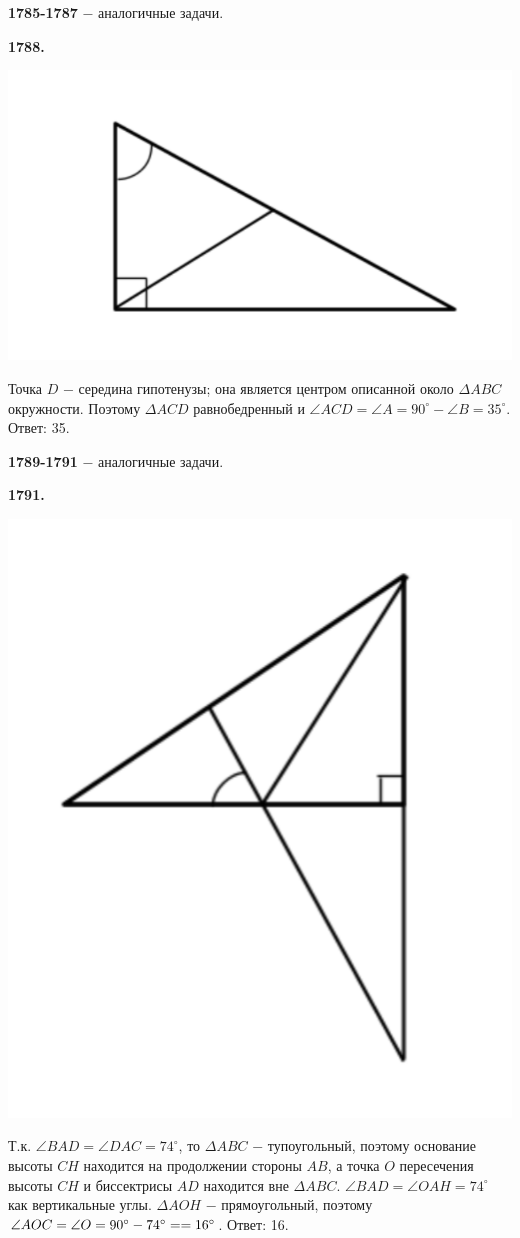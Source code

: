\textbf{1785-1787} $-$ аналогичные задачи.

\textbf{1788.}

{\centering \includegraphics[width=0.5\linewidth]{Geometry/Content/9.png}
	
}

Точка $D$ $-$ середина гипотенузы; она является центром описанной около $\Delta ABC$ окружности. Поэтому $\Delta ACD$ равнобедренный и $\angle ACD = \angle A = 90^\circ - \angle B = 35^\circ.$ 
\newline \null \hspace*{\fill} Ответ: 35.

\textbf{1789-1791} $-$ аналогичные задачи.

\clearpage 

\textbf{1791.}

{\centering \includegraphics[width=0.4\linewidth]{Geometry/Content/10.png}
	
}

Т.к. $\angle BAD = \angle DAC = 74^\circ$, то $\Delta ABC$ $-$ тупоугольный, поэтому основание высоты $CH$ находится на продолжении стороны $AB$, а точка $O$ пересечения высоты $CH$ и биссектрисы $AD$ находится вне $\Delta ABC$. $\angle BAD = \angle OAH = 74^\circ$  как вертикальные углы. $\Delta AOH$ $-$ прямоугольный, поэтому $\angle AOC = \angle O = 90^\circ - 74^\circ =\linebreak = 16^\circ$. \newline \null \hspace*{\fill} Ответ: 16.

